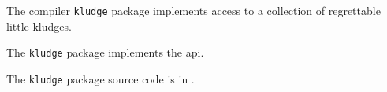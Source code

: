 
The compiler {\tt kludge} package implements access to a collection of 
regrettable little kludges. 

The {\tt kludge} package implements the  api. 

The {\tt kludge} package source code is in .

